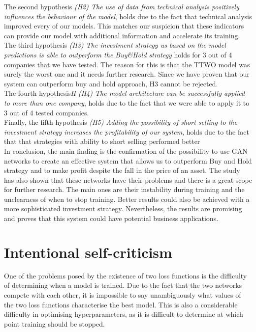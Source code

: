 \documentclass[11pt]{article} %
\begin{document}
The second hypothesis\textit{ (H2) The use of data from technical analysis positively influences the behaviour of the model}, holds due to the fact that technical analysis improved every of our models. This matches our suspicion that these indicators can provide our model with additional information and accelerate its training. \\

The third hypothesis\textit{ (H3) The investment strategy us based on the model predictions is able to outperform the Buy\&Hold strategy} holds for 3 out of 4 companies that we have tested. The reason for this is that the TTWO model was surely the worst one and it needs further research. Since we have proven that our system can outperform buy and hold approach, H3 cannot be rejected.\\

The fourth hypothesis\textit{H (H4) The model architecture can be successfully applied to more than one company}, holds due to the fact that we were able to apply it to 3 out of 4 tested companies. \\


Finally, the fifth hypothesis\textit{ (H5) Adding the possibility of short selling to the investment strategy increases the profitability of our system}, holds due to the fact that that strategies with ability to short selling performed better \\

In conclusion, the main finding is the confirmation of the possibility to use GAN networks to create an effective system that allows us to outperform Buy and Hold strategy and to make profit despite the fall in the price of an asset. The study has also shown that these networks have their problems and there is a great scope for further research. The main ones are their instability during training and the unclearness of when to stop training.  Better results could also be achieved with a more sophisticated investment strategy. Nevertheless, the results are promising and proves that this system could have potential business applications.

\section{Intentional self-criticism}

One of the problems posed by the existence of two loss functions is the difficulty of determining when a model is trained. Due to the fact that the two networks compete with each other, it is impossible to say unambiguously what values of the two loss functions characterise the best model. This is also a considerable difficulty in optimising hyperparameters, as it is difficult to determine at which point training should be stopped. \\
\end{document}
